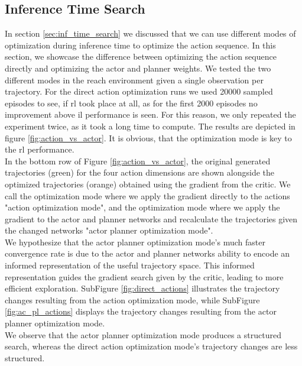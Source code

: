 \subsection{Inference Time Search}
\label{ref:com_opt_modes}
In section \ref{sec:inf_time_search} we discussed that we can use different modes of optimization during inference time to optimize the action sequence. In this section, 
we showcase the difference between optimizing the action sequence directly and optimizing the actor and planner weights. We tested the two different 
modes in the reach environment given a single observation per trajectory. For the direct 
action optimization runs we used 20000 sampled episodes to see, if \ac{rl} took place at all, as for the first 2000 episodes no improvement above 
\ac{il} performance is seen. For this reason, we only repeated the experiment twice, as it took a long time to compute. The results are depicted in figure 
\ref{fig:action_vs_actor}. It is obvious, that the optimization mode is key to the \ac{rl} performance. \\

In the bottom row of Figure \ref{fig:action_vs_actor}, the original generated trajectories (green) for the four action dimensions 
are shown alongside the optimized trajectories (orange) obtained using the gradient from the critic. We call the optimization mode 
where we apply the gradient directly to the actions "action optimization mode", and the optimization mode where we apply 
the gradient to the actor and planner networks and recalculate the trajectories given the changed networks "actor planner 
optimization mode".\\

We hypothesize that 
the actor planner optimization mode's much faster convergence rate is due to the actor and planner networks ability to 
encode an informed representation of the useful trajectory space. This informed representation guides the gradient search 
given by the critic, leading to more efficient exploration. SubFigure \ref{fig:direct_actions} illustrates the trajectory 
changes resulting from the action optimization mode, while SubFigure \ref{fig:ac_pl_actions} displays 
the trajectory changes resulting from the actor planner optimization mode. \\

We observe that the actor planner 
optimization mode produces a structured search, whereas the direct action optimization mode's trajectory changes are less structured.\\

